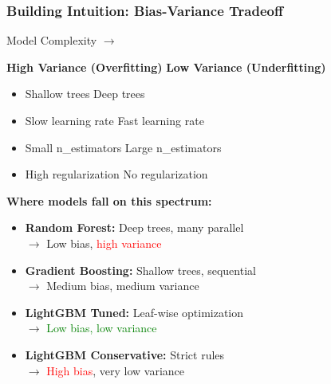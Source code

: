 \documentclass{beamer}
\begin{document}
\begin{frame}[fragile]
\frametitle{Building Intuition: Bias-Variance Tradeoff}

\vspace{-0.3cm}
\begin{center}
Model Complexity $\rightarrow$
\end{center}

\textbf{High Variance (Overfitting)} \hfill \textbf{Low Variance (Underfitting)}

\vspace{0.1cm}
\begin{itemize}
    \item Shallow trees \hfill Deep trees
    \item Slow learning rate \hfill Fast learning rate
    \item Small n\_estimators \hfill Large n\_estimators
    \item High regularization \hfill No regularization
\end{itemize}

\vspace{0.3cm}
\textbf{Where models fall on this spectrum:}

\begin{itemize}
    \item \textbf{Random Forest:} Deep trees, many parallel \\
    $\rightarrow$ Low bias, \textcolor{red}{high variance}

    \item \textbf{Gradient Boosting:} Shallow trees, sequential \\
    $\rightarrow$ Medium bias, medium variance

    \item \textbf{LightGBM Tuned:} Leaf-wise optimization \\
    $\rightarrow$ \textcolor{green}{Low bias, low variance} \checkmark

    \item \textbf{LightGBM Conservative:} Strict rules \\
    $\rightarrow$ \textcolor{red}{High bias}, very low variance
\end{itemize}

\end{frame}
\end{document}
